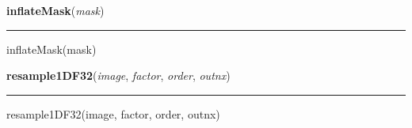     \label{multireg:expandArray:inflateMask}
    \vspace{0.5ex}

    \begin{boxedminipage}{\textwidth}

    \raggedright \textbf{inflateMask}(\textit{mask})

    \vspace{-1.5ex}

    \rule{\textwidth}{0.5\fboxrule}
    inflateMask(mask)

    \vspace{1ex}

    \end{boxedminipage}

    \label{multireg:expandArray:resample1DF32}
    \vspace{0.5ex}

    \begin{boxedminipage}{\textwidth}

    \raggedright \textbf{resample1DF32}(\textit{image}, \textit{factor}, \textit{order}, \textit{outnx})

    \vspace{-1.5ex}

    \rule{\textwidth}{0.5\fboxrule}
    resample1DF32(image, factor, order, outnx)

    \vspace{1ex}

    \end{boxedminipage}

